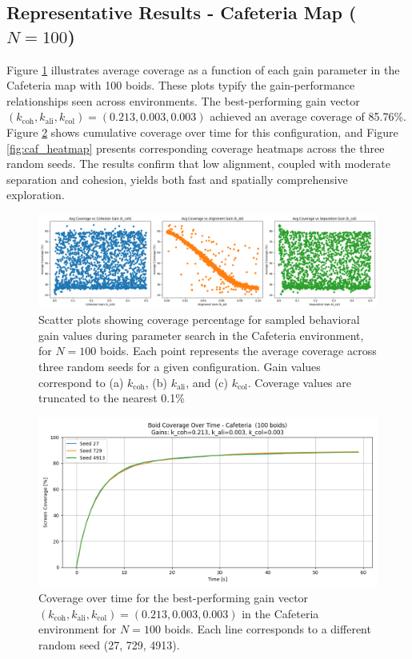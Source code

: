 \documentclass[12pt]{article}
\begin{document}
\subsection{Representative Results - Cafeteria Map (\(N = 100\))}

Figure \ref{fig:gains} illustrates average coverage as a function of each gain parameter in the Cafeteria map with 100 boids. These plots typify the gain-performance relationships seen across environments. The best-performing gain vector \((k_\text{coh}, k_\text{ali}, k_\text{col}) = (0.213,0.003,0.003)\) achieved an average coverage of 85.76\%. Figure \ref{fig:caf_cov} shows cumulative coverage over time for this configuration, and Figure \ref{fig:caf_heatmap} presents corresponding coverage heatmaps across the three random seeds. The results confirm that low alignment, coupled with moderate separation and cohesion, yields both fast and spatially comprehensive exploration.

\begin{figure}[h!]
\centering
\includegraphics[width=\linewidth]{pics/cov_vs_gains/cafeteria_100.png}
\caption{Scatter plots showing coverage percentage for sampled behavioral gain values during parameter search in the Cafeteria environment, for \(N = 100\) boids. Each point represents the average coverage across three random seeds for a given configuration. Gain values correspond to (a) \(k_\text{coh}\), (b) \(k_\text{ali}\), and (c) \(k_\text{col}\). Coverage values are truncated to the nearest 0.1\%}
\label{fig:gains}
\end{figure}

\begin{figure}[h!]
    \centering
    \includegraphics[width=0.7\linewidth]{optimal_cov_vs_time/cafeteria_100.png}
    \caption{Coverage over time for the best-performing gain vector \((k_\text{coh}, k_\text{ali}, k_\text{col}) = (0.213,0.003,0.003)\) in the Cafeteria environment for \(N = 100\) boids. Each line corresponds to a different random seed (27, 729, 4913).}
    \label{fig:caf_cov}
  \end{figure}
\end{document}
